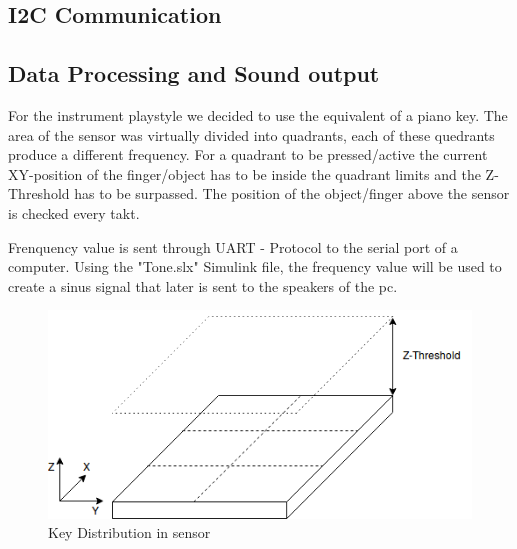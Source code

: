 \documentclass{article}
\begin{document}
\subsection{I2C Communication}

\newpage

\subsection{Data Processing and Sound output}

\noindent For the instrument playstyle we decided to use the equivalent of a piano key. The area of the sensor was virtually divided into quadrants, each of these quedrants produce a different frequency. For a quadrant to be pressed/active the current XY-position of the finger/object has to be inside the quadrant limits and the Z-Threshold has to be surpassed. The position of the object/finger above the sensor is checked every takt. 

\noindent Frenquency value is sent through UART - Protocol to the serial port of a computer. Using the "Tone.slx" Simulink file, the frequency value will be used to create a sinus signal that later is sent to the speakers of the pc. 

\begin{figure}[h]
\centering
\includegraphics[width=12cm]{SensorKeys.png}
\caption{Key Distribution in sensor}
\end{figure}
\end{document}

